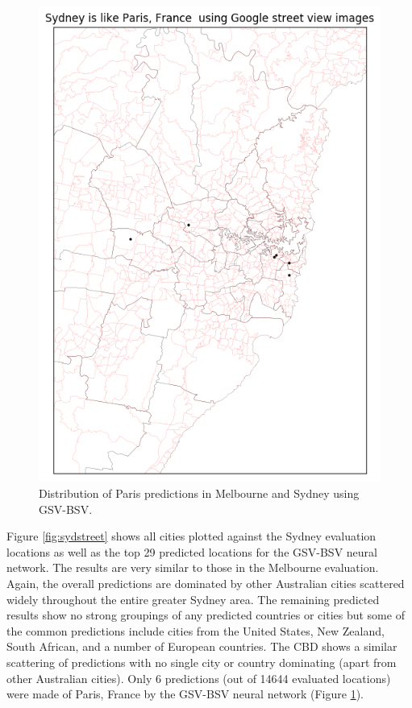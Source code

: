 \documentclass[sageh,times]{sagej}
\begin{document}
\begin{figure}[!htbp]
\includegraphics[scale=0.40]{Images/Sydney_Paris,France-GSV.png} 
\caption{Distribution of Paris predictions in Melbourne and Sydney using GSV-BSV.}    
 \label{fig:gsv_melsyd_paris}  
\end{figure}


Figure \ref{fig:sydstreet} shows all cities plotted against the Sydney evaluation locations as well as the top 29 predicted locations for the GSV-BSV neural network. The results are very similar to those in the Melbourne evaluation. Again, the overall predictions are dominated by other Australian cities scattered widely throughout the entire greater Sydney area. The remaining predicted results show no strong groupings of any predicted countries or cities but some of the common predictions include cities from the United States, New Zealand, South African, and a number of European countries. The CBD shows a similar scattering of predictions with no single city or country dominating (apart from other Australian cities). Only 6 predictions (out of 14644 evaluated locations) were made of Paris, France by the GSV-BSV neural network (Figure \ref{fig:gsv_melsyd_paris}).
\end{document}
